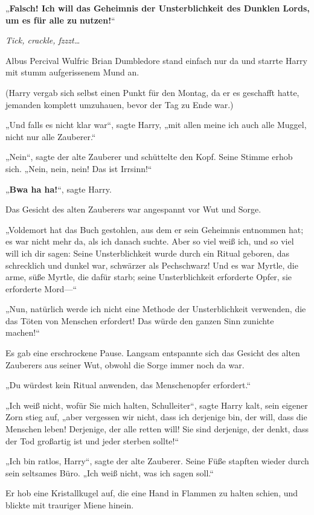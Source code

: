 {„\textbf{Falsch! Ich will das Geheimnis der Unsterblichkeit des Dunklen Lords, um es für alle zu} \textbf{nutzen!}“

\emph{Tick, crackle, fzzzt…}

Albus Percival Wulfric Brian Dumbledore stand einfach nur da und starrte Harry mit stumm aufgerissenem Mund an.

(Harry vergab sich selbst einen Punkt für den Montag, da er es geschafft hatte, jemanden komplett umzuhauen, bevor der Tag zu Ende war.)

„Und falls es nicht klar war“, sagte Harry, „mit allen meine ich auch alle Muggel, nicht nur alle Zauberer.“

„Nein“, sagte der alte Zauberer und schüttelte den Kopf. Seine Stimme erhob sich. „Nein, nein, nein! Das ist Irrsinn!“

„\textbf{Bwa ha ha!}“, sagte Harry.

Das Gesicht des alten Zauberers war angespannt vor Wut und Sorge.

„Voldemort hat das Buch gestohlen, aus dem er sein Geheimnis entnommen hat; es war nicht mehr da, als ich danach suchte. Aber so viel weiß ich, und so viel will ich dir sagen: Seine Unsterblichkeit wurde durch ein Ritual geboren, das schrecklich und dunkel war, schwärzer als Pechschwarz! Und es war Myrtle, die arme, süße Myrtle, die dafür starb; seine Unsterblichkeit erforderte Opfer, sie erforderte Mord—“

„Nun, natürlich werde ich nicht eine Methode der Unsterblichkeit verwenden, die das Töten von Menschen erfordert! Das würde den ganzen Sinn zunichte machen!“

Es gab eine erschrockene Pause. Langsam entspannte sich das Gesicht des alten Zauberers aus seiner Wut, obwohl die Sorge immer noch da war.

„Du würdest kein Ritual anwenden, das Menschenopfer erfordert.“

„Ich weiß nicht, wofür Sie mich halten, Schulleiter“, sagte Harry kalt, sein eigener Zorn stieg auf, „aber vergessen wir nicht, dass ich derjenige bin, der will, dass die Menschen leben! Derjenige, der alle retten will! Sie sind derjenige, der denkt, dass der Tod großartig ist und jeder sterben sollte!“

„Ich bin ratlos, Harry“, sagte der alte Zauberer. Seine Füße stapften wieder durch sein seltsames Büro. „Ich weiß nicht, was ich sagen soll.“

Er hob eine Kristallkugel auf, die eine Hand in Flammen zu halten schien, und blickte mit trauriger Miene hinein.

}
